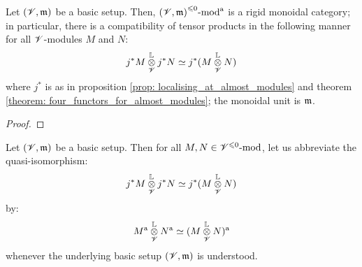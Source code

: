                 \begin{proposition} \label{prop: tensor_products_of_almost_modules}
                    Let $(\mathscr{V}, \mathfrak{m})$ be a basic setup. Then, ${(\mathscr{V}, \mathfrak{m})}^{\leqslant 0}\text{-}\mathrm{mod}^{\mathrm{a}}$ is a rigid monoidal category; in particular, there is a compatibility of tensor products in the following manner for all $\mathscr{V}$-modules $M$ and $N$:
                        $$j^*M \tensor^{\L}_{\scrV} j^*N \cong j^*(M \tensor^{\L}_{\scrV} N)$$
                    where $j^*$ is as in proposition \ref{prop: localising_at_almost_modules} and theorem \ref{theorem: four_functors_for_almost_modules}; the monoidal unit is $\mathfrak{m}$.
                \end{proposition}
                    \begin{proof}
                        
                    \end{proof}
                \begin{convention} \label{conv: almost_tensor_products}
                    Let $(\mathscr{V}, \mathfrak{m})$ be a basic setup. Then for all $M, N \in {\mathscr{V}}^{\leqslant 0}\text{-}\mathrm{mod}$, let us abbreviate the quasi-isomorphism:
                        $$j^*M \tensor^{\L}_{\scrV} j^*N \cong j^*(M \tensor^{\L}_{\scrV} N)$$
                    by:
                        $$M^{\almost} \tensor^{\L}_{\scrV} N^{\almost} \cong (M \tensor^{\L}_{\scrV} N)^{\almost}$$
                    whenever the underlying basic setup $(\mathscr{V}, \mathfrak{m})$ is understood.
                \end{convention}
